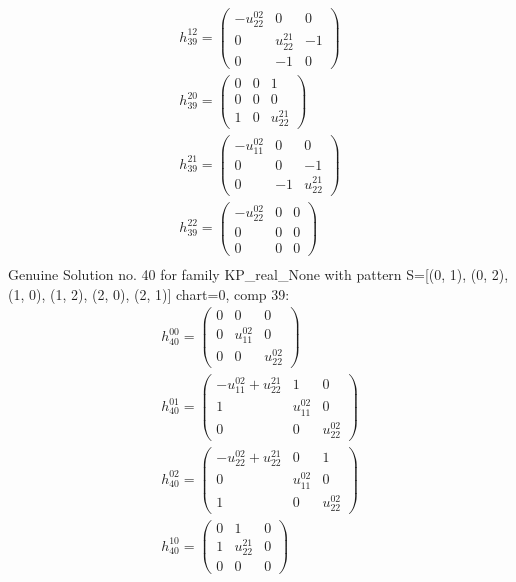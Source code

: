 \documentclass[a4paper, 11pt, twoside, onecolumn]{article}
\begin{document}
\begin{landscape}
\begin{gather*}
	 h_{39}^{12}=\begin{pmatrix}- u^{02}_{22} & 0 & 0\\0 & u^{21}_{22} & -1\\0 & -1 & 0\end{pmatrix}\\ 
	 h_{39}^{20}=\begin{pmatrix}0 & 0 & 1\\0 & 0 & 0\\1 & 0 & u^{21}_{22}\end{pmatrix}\\ 
	 h_{39}^{21}=\begin{pmatrix}- u^{02}_{11} & 0 & 0\\0 & 0 & -1\\0 & -1 & u^{21}_{22}\end{pmatrix}\\ 
	 h_{39}^{22}=\begin{pmatrix}- u^{02}_{22} & 0 & 0\\0 & 0 & 0\\0 & 0 & 0\end{pmatrix}\\ 
\end{gather*} 
Genuine Solution no. 40 for family KP_real_None with pattern S=[(0, 1), (0, 2), (1, 0), (1, 2), (2, 0), (2, 1)] chart=0, comp 39: 
\begin{gather*} 
	 h_{40}^{00}=\begin{pmatrix}0 & 0 & 0\\0 & u^{02}_{11} & 0\\0 & 0 & u^{02}_{22}\end{pmatrix}\\ 
	 h_{40}^{01}=\begin{pmatrix}- u^{02}_{11} + u^{21}_{22} & 1 & 0\\1 & u^{02}_{11} & 0\\0 & 0 & u^{02}_{22}\end{pmatrix}\\ 
	 h_{40}^{02}=\begin{pmatrix}- u^{02}_{22} + u^{21}_{22} & 0 & 1\\0 & u^{02}_{11} & 0\\1 & 0 & u^{02}_{22}\end{pmatrix}\\ 
	 h_{40}^{10}=\begin{pmatrix}0 & 1 & 0\\1 & u^{21}_{22} & 0\\0 & 0 & 0\end{pmatrix}\\ 

\end{gather*}
\end{landscape}
\end{document}
